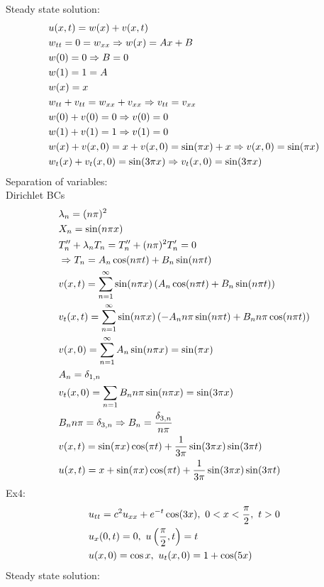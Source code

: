 \documentclass[11pt, fleqn]{article}
\begin{document}
Steady state solution:
\begin{align*}
    &u(x,t)=w(x)+v(x,t)\\
    &w_{tt}=0=w_{xx}\Rightarrow w(x)=Ax+B\\
    &w(0)=0\Rightarrow B=0\\
    &w(1)=1=A\\
    &w(x)=x\\
    &w_{tt}+v_{tt}=w_{xx}+v_{xx}\Rightarrow v_{tt}=v_{xx}\\
    &w(0)+v(0)=0\Rightarrow v(0)=0\\
    &w(1)+v(1)=1\Rightarrow v(1)=0\\
    &w(x)+v(x,0)=x+v(x,0)=\sin(\pi x)+x\Rightarrow v(x,0)=\sin(\pi x)\\
    &w_t(x)+v_t(x,0)=\sin(3\pi x)\Rightarrow v_t(x,0)=\sin(3\pi x)
\end{align*}
Separation of variables:\\
Dirichlet BCs
\begin{align*}
    &\lambda_n=(n\pi)^2\\
    &X_n=\sin(n\pi x)\\
    &T_n''+\lambda_nT_n=T_n''+(n\pi)^2T_n'=0\\
    &\Rightarrow T_n=A_n\cos(n\pi t)+B_n\sin(n\pi t)\\
    &v(x,t)=\sum_{n=1}^\infty\sin(n\pi x)\left( A_n\cos(n\pi t)+B_n\sin(n\pi t) \right)\\
    &v_t(x,t)=\sum_{n=1}^\infty\sin(n\pi x)\left( -A_nn\pi\sin(n\pi t)+B_nn\pi\cos(n\pi t) \right)\\
    &v(x,0)=\sum_{n=1}^\infty A_n\sin(n\pi x)=\sin(\pi x)\\
    &A_n=\delta_{1,n}\\
    &v_t(x,0)=\sum_{n=1}B_nn\pi\sin(n\pi x)=\sin(3\pi x)\\
    &B_nn\pi=\delta_{3,n}\Rightarrow B_n=\frac{\delta_{3,n}}{n\pi}\\
    &v(x,t)=\sin(\pi x)\cos(\pi t)+\frac{1}{3\pi}\sin(3\pi x)\sin(3\pi t)\\
    &u(x,t)=x+\sin(\pi x)\cos(\pi t)+\frac{1}{3\pi}\sin(3\pi x)\sin(3\pi t)
\end{align*}
Ex4:
\begin{align*}
    &u_{tt}=c^2u_{xx}+e^{-t}\cos(3x),\ 0<x<\frac{\pi}{2},\ t>0\\
    &u_x(0,t)=0,\ u\brround{\frac{\pi}{2},t}=t\\
    &u(x,0)=\cos x,\ u_t(x,0)=1+\cos(5x)
\end{align*}
Steady state solution:
\end{document}
